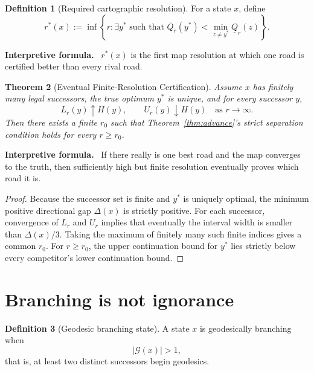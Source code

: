 \documentclass[11pt]{article}
\newtheorem{theorem}{Theorem}[section]
\theoremstyle{definition}
\newtheorem{definition}[theorem]{Definition}
\theoremstyle{remark}
\newcommand{\Qval}{Q}
\newcommand{\Gap}{\Delta}
\newenvironment{interpretiveformula}{%
  \begin{center}\begin{minipage}{0.92\textwidth}\small
  \textbf{Interpretive formula.}\ }{\end{minipage}\end{center}}
\begin{document}
\begin{definition}[Required cartographic resolution]
For a state $x$, define
\[
r^*(x):=\inf\left\{r:\exists y^*\text{ such that }\overline{\Qval}_r(y^*)<\min_{z\neq y^*}\underline{\Qval}_r(z)\right\}.
\]
\end{definition}

\begin{interpretiveformula}
$r^*(x)$ is the first map resolution at which one road is certified better than every rival road.
\end{interpretiveformula}

\begin{theorem}[Eventual Finite-Resolution Certification]\label{thm:eventual}
Assume $x$ has finitely many legal successors, the true optimum $y^*$ is unique, and for every successor $y$,
\[
L_r(y)\uparrow H(y),\qquad U_r(y)\downarrow H(y)
\quad\text{as }r\to\infty.
\]
Then there exists a finite $r_0$ such that Theorem~\ref{thm:advance}'s strict separation condition holds for every $r\ge r_0$.
\end{theorem}

\begin{interpretiveformula}
If there really is one best road and the map converges to the truth, then sufficiently high but finite resolution eventually proves which road it is.
\end{interpretiveformula}

\begin{proof}
Because the successor set is finite and $y^*$ is uniquely optimal, the minimum positive directional gap $\Gap(x)$ is strictly positive. For each successor, convergence of $L_r$ and $U_r$ implies that eventually the interval width is smaller than $\Gap(x)/3$. Taking the maximum of finitely many such finite indices gives a common $r_0$. For $r\ge r_0$, the upper continuation bound for $y^*$ lies strictly below every competitor's lower continuation bound.
\end{proof}

\section{Branching is not ignorance}

\begin{definition}[Geodesic branching state]
A state $x$ is geodesically branching when
\[
|\mathcal G(x)|>1,
\]
that is, at least two distinct successors begin geodesics.
\end{definition}
\end{document}
